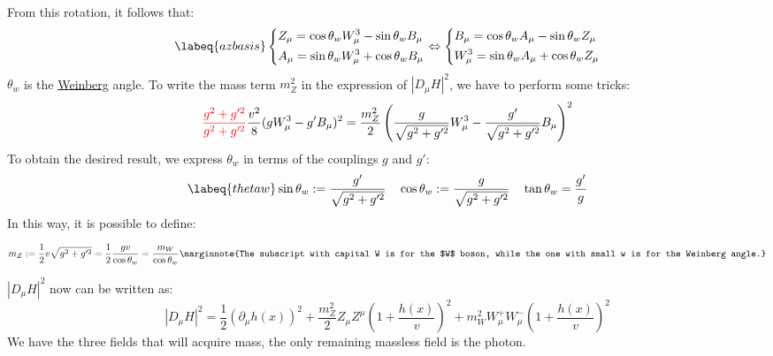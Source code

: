\documentclass[../main.tex]{subfiles}
\begin{document}
From this rotation, it follows that:
\begin{equation}
\labeq{azbasis}
\left\{
\begin{aligned}
&Z_\mu=\cos\theta_wW_\mu^3-\sin\theta_wB_\mu\\
&A_\mu=\sin\theta_wW_\mu^3+\cos\theta_wB_\mu
\end{aligned}
\right.
\Leftrightarrow
\left\{
\begin{aligned}
&B_\mu=\cos\theta_wA_\mu-\sin\theta_wZ_\mu\\
&W_\mu^3=\sin\theta_wA_\mu+\cos\theta_wZ_\mu
\end{aligned}
\right.
\end{equation}
$\theta_w$ is the \href{https://en.wikipedia.org/wiki/Steven_Weinberg}{Weinberg} angle. To write the mass term $m_Z^2$ in the expression of $|D_\mu H|^2$, we have to perform some tricks:
\[
{\color{red}\frac{g^2+g'^2}{g^2+g'^2}}\frac{v^2}{8}(gW_\mu^3-g'B_\mu)^2=\frac{m_Z^2}{2}\left(\frac{g}{\sqrt{g^2+g'^2}}W_\mu^3-\frac{g'}{\sqrt{g^2+g'^2}}B_\mu\right)^2
\]
To obtain the desired result, we express $\theta_w$ in terms of the couplings $g$ and $g'$:
\begin{equation}
\labeq{thetaw}  
\sin\theta_w:=\frac{g'}{\sqrt{g^2+g'^2}} \quad \cos\theta_w:=\frac{g}{\sqrt{g^2+g'^2}} \quad \tan\theta_w=\frac{g'}{g}
\end{equation}
In this way, it is possible to define:
\begin{kaobox}[frametitle=Mass of the $Z$ boson]
\[
m_Z:=\frac{1}{2}v\sqrt{g^2+g'^2}=\frac{1}{2}\frac{gv}{\cos\theta_w}=\frac{m_W}{\cos\theta_w}\marginnote{The subscript with capital W is for the $W$ boson, while the one with small w is for the Weinberg angle.}
\]    
\end{kaobox}
$|D_\mu H|^2$ now can be written as:
\[
|D_\mu H|^2=\frac{1}{2}(\partial_\mu h(x))^2+\frac{m_Z^2}{2}Z_\mu Z^\mu\left(1+\frac{h(x)}{v}\right)^2+m_W^2W_\mu^+W_\mu^-\left(1+\frac{h(x)}{v}\right)^2
\]
We have the three fields that will acquire mass, the only remaining massless field is the photon. 
\end{document}
